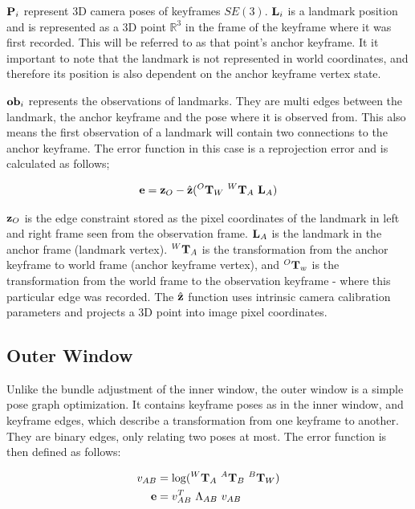 $\mathbf P_i$ represent 3D camera poses of keyframes $SE(3)$.  $\mathbf L_i$ is a landmark position and is represented as a 3D point $\mathbb{R}^3$ in the frame of the keyframe where it was first recorded.  This will be referred to as that point's anchor keyframe.  It it important to note that the landmark is not represented in world coordinates, and therefore its position is also dependent on the anchor keyframe vertex state.

$\mathbf {ob}_i$ represents the observations of landmarks.  They are multi edges between the landmark, the anchor keyframe and the pose where it is observed from.  This also means the first observation of a landmark will contain two connections to the anchor keyframe. The error function in this case is a reprojection error and is calculated as follows;

\begin{align}
 \mathbf e = \mathbf z_O - \hat{\mathbf z}( ^{O}\mathbf T_W \ ^W \mathbf T_{A} \ \mathbf L_{A})
\end{align}

$\mathbf z_O$ is the edge constraint stored as the pixel coordinates of the landmark in left and right frame seen from the observation  frame. $\mathbf L_{A}$ is the landmark in the anchor frame (landmark vertex).  $^W \mathbf T_{A}$ is the transformation from the anchor keyframe to world frame (anchor keyframe vertex), and $^{O}\mathbf T_w$ is the transformation from the world frame to the observation keyframe -  where this particular edge was recorded.  The $\hat{\mathbf z}$ function uses intrinsic camera calibration parameters and projects a 3D point into image pixel coordinates.

\subsection{Outer Window}

Unlike the bundle adjustment of the inner window, the outer window is a simple pose graph optimization.  It contains keyframe poses as in the inner window, and keyframe edges, which describe a transformation from one keyframe to another.  They are binary edges, only relating two poses at most.  The error function is then defined as follows:

\begin{align}
 v_{AB} &=  \log(^{W}\mathbf T_{A} \ ^{A} \mathbf T_{B} \ ^{B} \mathbf T_{W}) \\
 \mathbf e &= v_{AB}^T \ \Lambda_{AB} \ v_{AB}
\end{align}

